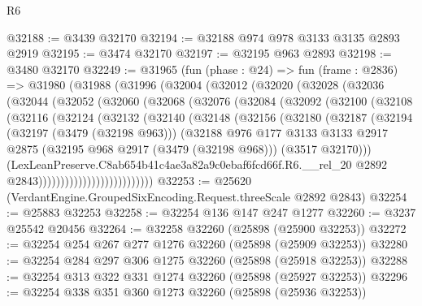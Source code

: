 \begin{lexlean}{R6}
\begin{coremodule}
@32188 := @3439 @32170
@32194 := @32188 @974 @978 @3133 @3135 @2893 @2919
@32195 := @3474 @32170
@32197 := @32195 @963 @2893
@32198 := @3480 @32170
@32249 := @31965
    (fun (phase : @24) =>
    fun (frame : @2836) =>
    @31980
      (@31988
        (@31996
          (@32004
            (@32012
              (@32020
                (@32028
                  (@32036
                    (@32044
                      (@32052
                        (@32060
                          (@32068
                            (@32076
                              (@32084
                                (@32092
                                  (@32100
                                    (@32108
                                      (@32116
                                        (@32124
                                          (@32132
                                            (@32140
                                              (@32148
                                                (@32156
                                                  (@32180
                                                    (@32187
                                                      (@32194
                                                        (@32197 (@3479 (@32198 @963)))
                                                        (@32188
                                                          @976
                                                          @177
                                                          @3133
                                                          @3133
                                                          @2917
                                                          @2875
                                                          (@32195 @968 @2917 (@3479 (@32198 @968)))
                                                          (@3517 @32170)))
                                                      (LexLeanPreserve.C8ab654b41c4ae3a82a9c0ebaf6fcd66f.R6.__rel_20
                                                        @2892
                                                        @2843))))))))))))))))))))))))))
@32253 := @25620 (VerdantEngine.GroupedSixEncoding.Request.threeScale @2892 @2843)
@32254 := @25883 @32253
@32258 := @32254 @136 @147 @247 @1277
@32260 := @3237 @25542 @20456
@32264 := @32258 @32260 (@25898 (@25900 @32253))
@32272 := @32254 @254 @267 @277 @1276 @32260 (@25898 (@25909 @32253))
@32280 := @32254 @284 @297 @306 @1275 @32260 (@25898 (@25918 @32253))
@32288 := @32254 @313 @322 @331 @1274 @32260 (@25898 (@25927 @32253))
@32296 := @32254 @338 @351 @360 @1273 @32260 (@25898 (@25936 @32253))

\end{coremodule}
\end{lexlean}
